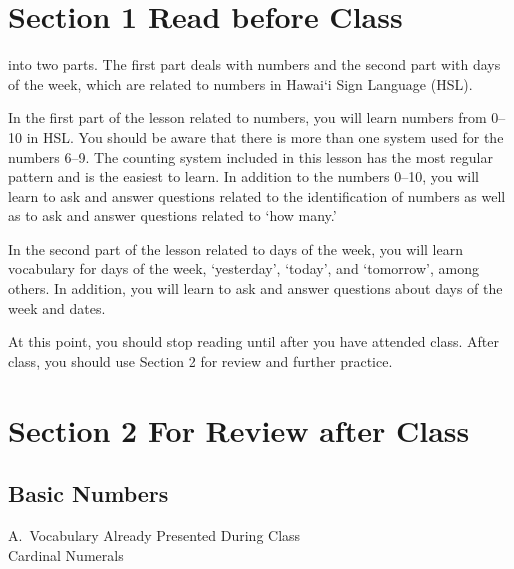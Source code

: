 \documentclass{tufte-book}
\begin{document}
\section{Section 1 Read before Class}

 into two parts. The first part deals with numbers and the second part with days of the week, which are related to numbers in Hawai`i Sign Language (HSL).

In the first part of the lesson related to numbers, you will learn numbers from 0--10 in HSL. You should be aware that there is more than one system used for the numbers 6--9. The counting system included in this lesson has the most regular pattern and is the easiest to learn. In addition to the numbers 0--10, you will learn to ask and answer questions related to the identification of numbers as well as to ask and answer questions related to `how many.'

In the second part of the lesson related to days of the week, you will learn vocabulary for days of the week, `yesterday', `today', and  `tomorrow', among others. In addition, you will learn to ask and answer questions about  days of the week and dates.

At this point, you should stop reading until after you have attended class. After class, you should use Section 2 for review and further practice.
\newpage
\section{Section 2 For Review after Class}
\subsection{Basic Numbers}

\noindent A.~Vocabulary Already Presented During Class\\

\vspace{0.25cm} \noindent Cardinal Numerals
\end{document}
